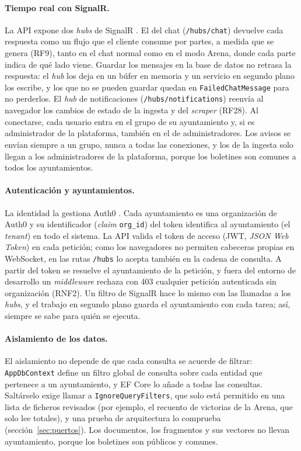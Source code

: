 \paragraph{Tiempo real con SignalR.} La API expone dos \emph{hubs} de SignalR \cite{signalr}. El del chat (\texttt{/hubs/chat}) devuelve cada respuesta como un flujo que el cliente consume por partes, a medida que se genera (RF9), tanto en el chat normal como en el modo Arena, donde cada parte indica de qué lado viene. Guardar los mensajes en la base de datos no retrasa la respuesta: el \emph{hub} los deja en un búfer en memoria y un servicio en segundo plano los escribe, y los que no se pueden guardar quedan en \texttt{FailedChatMessage} para no perderlos. El \emph{hub} de notificaciones (\texttt{/hubs/notifications}) reenvía al navegador los cambios de estado de la ingesta y del \emph{scraper} (RF28). Al conectarse, cada usuario entra en el grupo de su ayuntamiento y, si es administrador de la plataforma, también en el de administradores. Los avisos se envían siempre a un grupo, nunca a todas las conexiones, y los de la ingesta solo llegan a los administradores de la plataforma, porque los boletines son comunes a todos los ayuntamientos.

\paragraph{Autenticación y ayuntamientos.} La identidad la gestiona Auth0 \cite{auth0}. Cada ayuntamiento es una organización de Auth0 y su identificador (\emph{claim} \texttt{org\_id}) del token identifica al ayuntamiento (el \emph{tenant}) en todo el sistema. La API valida el token de acceso (JWT, \emph{JSON Web Token}) en cada petición; como los navegadores no permiten cabeceras propias en WebSocket, en las rutas \texttt{/hubs} lo acepta también en la cadena de consulta. A partir del token se resuelve el ayuntamiento de la petición, y fuera del entorno de desarrollo un \emph{middleware} rechaza con 403 cualquier petición autenticada sin organización (RNF2). Un filtro de SignalR hace lo mismo con las llamadas a los \emph{hubs}, y el trabajo en segundo plano guarda el ayuntamiento con cada tarea; así, siempre se sabe para quién se ejecuta.

\paragraph{Aislamiento de los datos.} El aislamiento no depende de que cada consulta se acuerde de filtrar: \texttt{AppDbContext} define un filtro global de consulta sobre cada entidad que pertenece a un ayuntamiento, y EF Core lo añade a todas las consultas. Saltárselo exige llamar a \texttt{IgnoreQueryFilters}, que solo está permitido en una lista de ficheros revisados (por ejemplo, el recuento de victorias de la Arena, que solo lee totales), y una prueba de arquitectura lo comprueba (sección~\ref{sec:puertos}). Los documentos, los fragmentos y sus vectores no llevan ayuntamiento, porque los boletines son públicos y comunes.

